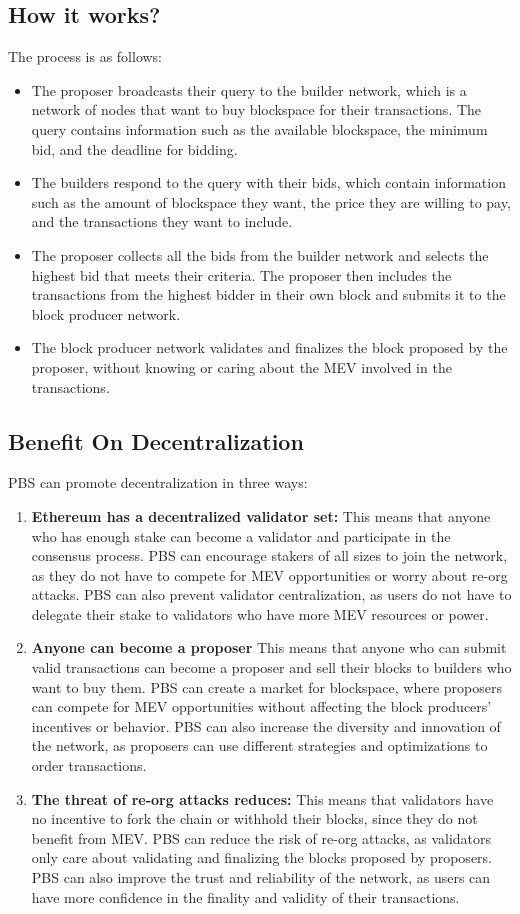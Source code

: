 \subsection{How it works?}
The process is as follows:
\begin{itemize}
	\item The proposer broadcasts their query to the builder network, which is a network of nodes that want to buy blockspace for their transactions. The query contains information such as the available blockspace, the minimum bid, and the deadline for bidding.
	\item The builders respond to the query with their bids, which contain information such as the amount of blockspace they want, the price they are willing to pay, and the transactions they want to include.
	\item The proposer collects all the bids from the builder network and selects the highest bid that meets their criteria. The proposer then includes the transactions from the highest bidder in their own block and submits it to the block producer network.
	\item The block producer network validates and finalizes the block proposed by the proposer, without knowing or caring about the MEV involved in the transactions.
\end{itemize}
\subsection{Benefit On Decentralization}
PBS can promote decentralization in three ways:\\
\begin{enumerate}
	\item \textbf{Ethereum has a decentralized validator set:} This means that anyone who has enough stake can become a validator and participate in the consensus process. PBS can encourage stakers of all sizes to join the network, as they do not have to compete for MEV opportunities or worry about re-org attacks. PBS can also prevent validator centralization, as users do not have to delegate their stake to validators who have more MEV resources or power.
	\item \textbf{Anyone can become a proposer} This means that anyone who can submit valid transactions can become a proposer and sell their blocks to builders who want to buy them. PBS can create a market for blockspace, where proposers can compete for MEV opportunities without affecting the block producers’ incentives or behavior. PBS can also increase the diversity and innovation of the network, as proposers can use different strategies and optimizations to order transactions.
	\item \textbf{The threat of re-org attacks reduces:} This means that validators have no incentive to fork the chain or withhold their blocks, since they do not benefit from MEV. PBS can reduce the risk of re-org attacks, as validators only care about validating and finalizing the blocks proposed by proposers. PBS can also improve the trust and reliability of the network, as users can have more confidence in the finality and validity of their transactions.
\end{enumerate}
